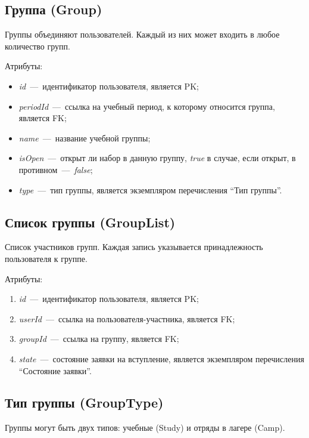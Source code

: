 \documentclass[14pt]{article}
\begin{document}
\subsection{Группа (Group)}

Группы объединяют пользователей. Каждый из них может входить в любое количество групп.

Атрибуты:
\begin{itemize}
	\item \emph{id}~---~идентификатор пользователя, является PK;
	\item \emph{periodId}~---~ссылка на учебный период, к которому относится группа, является FK;
	\item \emph{name}~---~название учебной группы;
	\item \emph{isOpen}~---~открыт ли набор в данную группу, \emph{true} в случае, если открыт, в противном~---~\emph{false};
	\item \emph{type}~---~тип группы, является экземпляром перечисления ``Тип группы''.
\end{itemize}

\subsection{Список группы (GroupList)}

Список участников групп. Каждая запись указывается принадлежность пользователя к группе.

Атрибуты:
\begin{enumerate}
	\item \emph{id}~---~идентификатор пользователя, является PK; 
	\item \emph{userId}~---~ссылка на пользователя-участника, является FK;
	\item \emph{groupId}~---~ссылка на группу, является FK;
	\item \emph{state}~---~состояние заявки на вступление, является экземпляром перечисления ``Состояние заявки''.
\end{enumerate}


\subsection{Тип группы (GroupType)}

Группы могут быть двух типов: учебные (Study) и отряды в лагере (Camp).
\end{document}
